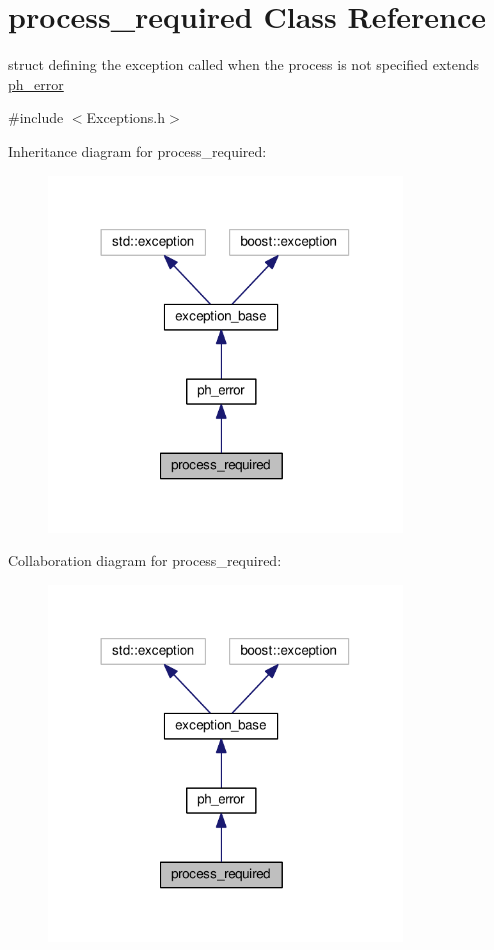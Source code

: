 \hypertarget{structprocess__required}{\section{process\+\_\+required Class Reference}
\label{structprocess__required}
}


struct defining the exception called when the process is not specified extends \hyperlink{structph__error}{ph\+\_\+error}  




{\ttfamily \#include $<$Exceptions.\+h$>$}



Inheritance diagram for process\+\_\+required\+:\nopagebreak
\begin{figure}[H]
\begin{center}
\leavevmode
\includegraphics[width=266pt]{structprocess__required__inherit__graph}
\end{center}
\end{figure}


Collaboration diagram for process\+\_\+required\+:\nopagebreak
\begin{figure}[H]
\begin{center}
\leavevmode
\includegraphics[width=266pt]{structprocess__required__coll__graph}
\end{center}
\end{figure}


